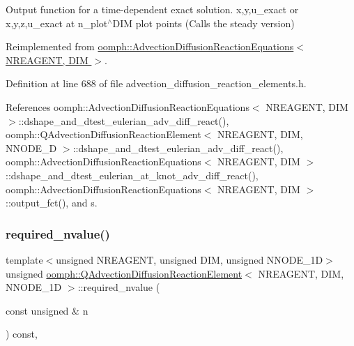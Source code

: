 Output function for a time-\/dependent exact solution. x,y,u\+\_\+exact or x,y,z,u\+\_\+exact at n\+\_\+plot$^\wedge$\+D\+IM plot points (Calls the steady version) 



Reimplemented from \hyperlink{classoomph_1_1AdvectionDiffusionReactionEquations_abfb9e33a5575df7f36cdee7e44b3d282}{oomph\+::\+Advection\+Diffusion\+Reaction\+Equations$<$ N\+R\+E\+A\+G\+E\+N\+T, D\+I\+M $>$}.



Definition at line 688 of file advection\+\_\+diffusion\+\_\+reaction\+\_\+elements.\+h.



References oomph\+::\+Advection\+Diffusion\+Reaction\+Equations$<$ N\+R\+E\+A\+G\+E\+N\+T, D\+I\+M $>$\+::dshape\+\_\+and\+\_\+dtest\+\_\+eulerian\+\_\+adv\+\_\+diff\+\_\+react(), oomph\+::\+Q\+Advection\+Diffusion\+Reaction\+Element$<$ N\+R\+E\+A\+G\+E\+N\+T, D\+I\+M, N\+N\+O\+D\+E\+\_\+D $>$\+::dshape\+\_\+and\+\_\+dtest\+\_\+eulerian\+\_\+adv\+\_\+diff\+\_\+react(), oomph\+::\+Advection\+Diffusion\+Reaction\+Equations$<$ N\+R\+E\+A\+G\+E\+N\+T, D\+I\+M $>$\+::dshape\+\_\+and\+\_\+dtest\+\_\+eulerian\+\_\+at\+\_\+knot\+\_\+adv\+\_\+diff\+\_\+react(), oomph\+::\+Advection\+Diffusion\+Reaction\+Equations$<$ N\+R\+E\+A\+G\+E\+N\+T, D\+I\+M $>$\+::output\+\_\+fct(), and s.

\mbox{\label{classoomph_1_1QAdvectionDiffusionReactionElement_ac6a740436c52b5c541c1758508be0710}} 
\subsubsection{\texorpdfstring{required\+\_\+nvalue()}{required\_nvalue()}}
{\footnotesize\ttfamily template$<$unsigned N\+R\+E\+A\+G\+E\+NT, unsigned D\+IM, unsigned N\+N\+O\+D\+E\+\_\+1D$>$ \\
unsigned \hyperlink{classoomph_1_1QAdvectionDiffusionReactionElement}{oomph\+::\+Q\+Advection\+Diffusion\+Reaction\+Element}$<$ N\+R\+E\+A\+G\+E\+NT, D\+IM, N\+N\+O\+D\+E\+\_\+1D $>$\+::required\+\_\+nvalue (\begin{DoxyParamCaption}\item[{const unsigned \&}]{n }\end{DoxyParamCaption}) const\hspace{0.3cm}{\ttfamily [inline]}, {\ttfamily [virtual]}}



